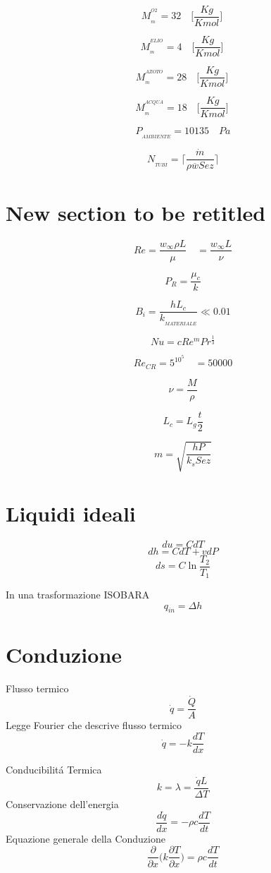 \documentclass[10pt,portrait,a4paper]{article}
\begin{document}
\begin{multicols}{2}
\[ M_{_{m}}^{^{O2}} = 32 \quad \Big [ \frac {Kg}{Kmol} \Big ] \ \]

\[ M_{_{m}}^{^{ELIO}} = 4 \quad \Big [ \frac {Kg}{Kmol} \Big ] \ \]

\[ M_{_{m}}^{^{AZOTO}} = 28 \quad \Big [ \frac {Kg}{Kmol} \Big ] \ \]

\[ M_{_{m}}^{^{ACQUA}} = 18 \quad \Big [ \frac {Kg}{Kmol} \Big ] \ \]

\[ P_{_{AMBIENTE}} = 10135  \quad Pa \]

\[ N_{_{TUBI}} = \Bigg \lceil \frac {\dot m}{\rho \overline w Sez} \Bigg \rceil \]


\section{New section to be retitled}

\[ Re = \frac {w_{\infty} \rho L}{\mu} \quad   = \frac{w_{\infty} L}{\nu} \]

\[ P_{R} = \frac {\mu_{c}}{k} \]




\[ B_{i} = \frac {hL_{c}}{k_{_{MATERIALE}}} \ll 0.01\]


\[ Nu = cRe^{m} Pr^{\frac {1}{3}} \]

\[ Re_{CR} = 5^{10^{5}} \quad =50000 \]



\[\nu = \frac {M}{\rho} \]

\[L_{c} = L_{g} \frac {t}{2} \]

\[ m = \sqrt{
	\frac{hP}{k_s Sez}
}
\]



\section{Liquidi ideali}
\[
	du = CdT
	\]
\[
	dh = CdT + vdP
	\]
\[
	ds = C\ln\frac{T_2}{T_1}
	\]

	In una trasformazione ISOBARA
\[
	q_{in} = \Delta h
	\]	

\section{Conduzione}
Flusso termico
\[
	\dot{q} = \frac{\dot{Q}}{A}
	\]
Legge Fourier che descrive flusso termico
\[
	\dot{q} = -k\frac{dT}{dx}
	\]

	Conducibilitá Termica
	\[ k = \lambda = \frac{\dot{q}L}{\Delta T}\]
Conservazione dell'energia
\[
	\frac{d\dot{q}}{dx}=-\rho c\frac{dT}{dt}
	\]
Equazione generale della Conduzione
\[\frac{\partial}{\partial x}\bigg( k\frac{\partial T}{\partial x} \bigg) = \rho c \frac{dT}{dt}
\]


\end{multicols}
\end{document}
